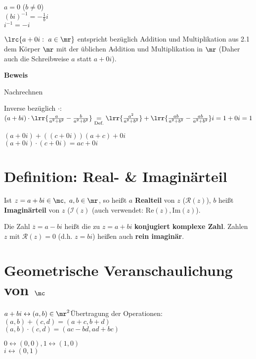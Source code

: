 		$a=0$ ($b\neq 0$)\\
		$(bi)^{-1}=-\frac{1}{b}i$\\
		$i^{-1}=-i$
		\item $\lrc{a+0i:\ a\in\mr}$ entspricht bezüglich Addition und Multiplikation aus 2.1 dem Körper $\mr$ mit der üblichen Addition und Multiplikation in $\mr$ (Daher auch die Schreibweise $a$ statt $a+0i$).
	\subExEnd

	\textbf{Beweis}
		\item Nachrechnen
		\item Inverse bezüglich $\cdot$:\\
		$(a+bi)\cdot\lrr{\frac{a}{a^2+b^2}-\frac{b}{a^2+b^2}}\underset{\mbox{\scriptsize Def.}}{=}\lrr{\frac{a^2}{a^2+b^2}}+\lrr{\frac{ab}{a^2+b^2}-\frac{ab}{a^2+b^2}}i=1+0i=1$
		\item $(a+0i)+((c+0i))(a+c)+0i$\\
		$(a+0i)\cdot(c+0i)=ac+0i$
	\subExEnd

\section{Definition: Real- \& Imaginärteil}
	Ist $z=a+bi\in\mc,\ a,b\in\mr$, so heißt $a$ \textbf{Realteil} von $z$ ($\mathcal{R}(z)$), $b$ heißt \textbf{Imaginärteil} von $z$ ($\mathcal{I}(z)$ (auch verwendet: $\mbox{Re}(z),\mbox{Im}(z)$).

	Die Zahl $\overline{z}=a-bi$ heißt die zu $z=a+bi$ \textbf{konjugiert komplexe Zahl}. Zahlen $z$ mit $\mathcal{R}(z)=0$ (d.h. $z=bi$) heißen auch \textbf{rein imaginär}.

\section{Geometrische Veranschaulichung von \texorpdfstring{$\mc$}{C}}
	$a+bi\leftrightarrow(a,b)\in\mr^2$\quad Übertragung der Operationen:\\
	$(a,b)+(c,d)=(a+c,b+d)$\\
	$(a,b)\cdot(c,d)=(ac-bd,ad+bc)$

	$0\leftrightarrow(0,0), 1\leftrightarrow(1,0)$\\
	$i\leftrightarrow(0,1)$

